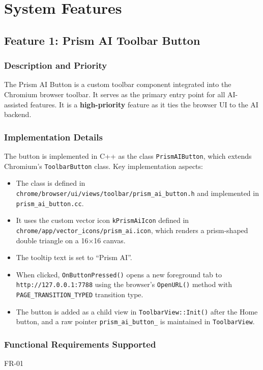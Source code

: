 \chapter{System Features}

\section{Feature 1: Prism AI Toolbar Button}

\subsection{Description and Priority}
The Prism AI Button is a custom toolbar component integrated into the Chromium browser toolbar. It serves as the primary entry point for all AI-assisted features. It is a \textbf{high-priority} feature as it ties the browser UI to the AI backend.

\subsection{Implementation Details}
The button is implemented in C++ as the class \texttt{PrismAIButton}, which extends Chromium's \texttt{ToolbarButton} class. Key implementation aspects:
\begin{itemize}[leftmargin=*]
    \item The class is defined in \texttt{chrome/browser/ui/views/toolbar/prism\_ai\_button.h} and implemented in \texttt{prism\_ai\_button.cc}.
    \item It uses the custom vector icon \texttt{kPrismAiIcon} defined in \texttt{chrome/app/vector\_icons/prism\_ai.icon}, which renders a prism-shaped double triangle on a 16$\times$16 canvas.
    \item The tooltip text is set to ``Prism AI''.
    \item When clicked, \texttt{OnButtonPressed()} opens a new foreground tab to \texttt{http://127.0.0.1:7788} using the browser's \texttt{OpenURL()} method with \texttt{PAGE\_TRANSITION\_TYPED} transition type.
    \item The button is added as a child view in \texttt{ToolbarView::Init()} after the Home button, and a raw pointer \texttt{prism\_ai\_button\_} is maintained in \texttt{ToolbarView}.
\end{itemize}

\subsection{Functional Requirements Supported}
FR-01


